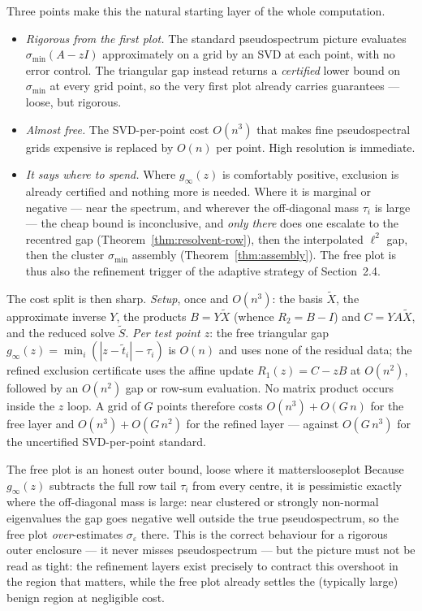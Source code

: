 \documentclass[11pt, a4paper]{article}
\numberwithin{equation}{section}
\newcommand{\abs}[1]{\left|#1\right|}
\newcommand{\tX}{\widetilde{X}}
\begin{document}
Three points make this the natural starting layer of the whole computation.

\begin{itemize}
  \item \emph{Rigorous from the first plot.}  The standard pseudospectrum
    picture evaluates $\sigma_{\min}(A - zI)$ approximately on a grid by an SVD
    at each point, with no error control.  The triangular gap instead returns a
    \emph{certified} lower bound on $\sigma_{\min}$ at every grid point, so the
    very first plot already carries guarantees --- loose, but rigorous.
  \item \emph{Almost free.}  The SVD-per-point cost $O(n^3)$ that makes fine
    pseudospectral grids expensive is replaced by $O(n)$ per point.  High
    resolution is immediate.
  \item \emph{It says where to spend.}  Where $g_\infty(z)$ is comfortably
    positive, exclusion is already certified and nothing more is needed.  Where
    it is marginal or negative --- near the spectrum, and wherever the
    off-diagonal mass $\tau_i$ is large --- the cheap bound is inconclusive, and
    \emph{only there} does one escalate to the recentred gap
    (Theorem~\ref{thm:resolvent-row}), then the interpolated $\ell^2$ gap, then
    the cluster $\sigma_{\min}$ assembly (Theorem~\ref{thm:assembly}).  The free
    plot is thus also the refinement trigger of the adaptive strategy of
    Section~2.4.
\end{itemize}

The cost split is then sharp.  \emph{Setup}, once and $O(n^3)$: the basis
$\tX$, the approximate inverse $Y$, the products $B = Y\tX$ (whence $R_2 = B -
I$) and $C = YA\tX$, and the reduced solve $\tilde S$.  \emph{Per test point
$z$}: the free triangular gap $g_\infty(z) = \min_i(\abs{z - \tilde t_i} -
\tau_i)$ is $O(n)$ and uses none of the residual data; the refined exclusion
certificate uses the affine update $R_1(z) = C - zB$ at $O(n^2)$, followed by an
$O(n^2)$ gap or row-sum evaluation.  No matrix product occurs inside the $z$
loop.  A grid of $G$ points therefore costs $O(n^3) + O(G\,n)$ for the free
layer and $O(n^3) + O(G\,n^2)$ for the refined layer --- against $O(G\,n^3)$ for
the uncertified SVD-per-point standard.

\begin{remark}{The free plot is an honest outer bound, loose where it matters}{looseplot}
  Because $g_\infty(z)$ subtracts the full row tail $\tau_i$ from every centre,
  it is pessimistic exactly where the off-diagonal mass is large: near clustered
  or strongly non-normal eigenvalues the gap goes negative well outside the true
  pseudospectrum, so the free plot \emph{over}-estimates $\sigma_\varepsilon$
  there.  This is the correct behaviour for a rigorous outer enclosure --- it
  never misses pseudospectrum --- but the picture must not be read as tight: the
  refinement layers exist precisely to contract this overshoot in the region
  that matters, while the free plot already settles the (typically large)
  benign region at negligible cost.
\end{remark}
\end{document}
